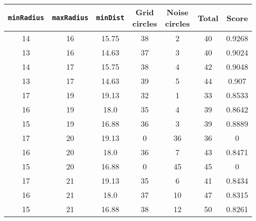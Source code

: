 \documentclass[letterpaper, 12pt]{article}
\begin{document}
\begin{longtable}{|c|c|c|c|c|c|c|}
\hline
\textbf{\texttt{minRadius}} & \textbf{\texttt{maxRadius}} & \textbf{\texttt{minDist}} & \textbf{Grid circles} & \textbf{Noise circles} & \textbf{Total} & \textbf{Score} \\
\hline
14 & 16 & 15.75 & 38 & 2 & 40 & 0.9268 \\
\hline
13 & 16 & 14.63 & 37 & 3 & 40 & 0.9024 \\
\hline
14 & 17 & 15.75 & 38 & 4 & 42 & 0.9048 \\
\hline
13 & 17 & 14.63 & 39 & 5 & 44 & 0.907 \\
\hline
17 & 19 & 19.13 & 32 & 1 & 33 & 0.8533 \\
\hline
16 & 19 & 18.0 & 35 & 4 & 39 & 0.8642 \\
\hline
15 & 19 & 16.88 & 36 & 3 & 39 & 0.8889 \\
\hline
17 & 20 & 19.13 & 0 & 36 & 36 & 0 \\
\hline
16 & 20 & 18.0 & 36 & 7 & 43 & 0.8471 \\
\hline
15 & 20 & 16.88 & 0 & 45 & 45 & 0 \\
\hline
17 & 21 & 19.13 & 35 & 6 & 41 & 0.8434 \\
\hline
16 & 21 & 18.0 & 37 & 10 & 47 & 0.8315 \\
\hline
15 & 21 & 16.88 & 38 & 12 & 50 & 0.8261 \\
\hline
\end{longtable}
\end{document}
